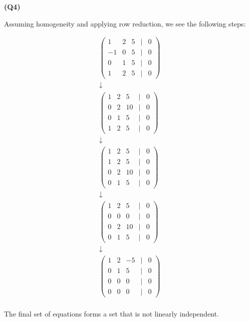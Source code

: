 \documentclass[12pt, a4paper]{article}
\begin{document}
\textbf{(Q4)}

Assuming homogeneity and applying row reduction, we see the following steps:

\begin{gather*}
    \begin{pmatrix}
        1 & 2 & 5 & \vert & 0\\
        -1 & 0 & 5 & \vert & 0\\
        0 & 1 & 5 & \vert & 0\\
        1 & 2 & 5 & \vert & 0
    \end{pmatrix}\\
    \downarrow\\
    \begin{pmatrix}
        1 & 2 & 5 & \vert & 0\\
        0 & 2 & 10 & \vert & 0\\
        0 & 1 & 5 & \vert & 0\\
        1 & 2 & 5 & \vert & 0
    \end{pmatrix}\\
    \downarrow\\
    \begin{pmatrix}
        1 & 2 & 5 & \vert & 0\\
        1 & 2 & 5 & \vert & 0\\
        0 & 2 & 10 & \vert & 0\\
        0 & 1 & 5 & \vert & 0
    \end{pmatrix}\\
    \downarrow\\
    \begin{pmatrix}
        1 & 2 & 5 & \vert & 0\\
        0 & 0 & 0 & \vert & 0\\
        0 & 2 & 10 & \vert & 0\\
        0 & 1 & 5 & \vert & 0
    \end{pmatrix}\\
    \downarrow\\
    \begin{pmatrix}
        1 & 2 & -5 & \vert & 0\\
        0 & 1 & 5 & \vert & 0\\
        0 & 0 & 0 & \vert & 0\\
        0 & 0 & 0 & \vert & 0
    \end{pmatrix}\\
\end{gather*}

The final set of equations forms a set that is not linearly independent.
\end{document}
